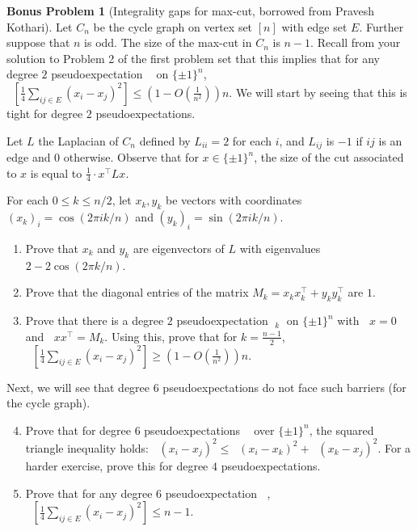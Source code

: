 \documentclass[11pt]{article}
\theoremstyle{definition}
\newtheorem{bproblem}[theorem]{Bonus Problem}
\DeclareMathOperator{\pE}{\widetilde{\mathbb{E}}} %
\begin{document}
\begin{bproblem}[Integrality gaps for max-cut, borrowed from Pravesh Kothari]
  Let $C_n$ be the cycle graph on vertex set $[n]$ with edge set $E$. Further suppose that $n$ is odd.
  The size of the max-cut in $C_n$ is $n-1$. Recall from your solution to Problem 2 of the first problem set that this implies that for any degree $2$ pseudoexpectation $\pE$ on $\{\pm 1\}^n$, $\pE\left[ \frac{1}{4} \sum_{ij \in E} (x_i - x_j)^2 \right] \le \left(1 - O\left( \frac{1}{n^2} \right)\right) n$. We will start by seeing that this is tight for degree $2$ pseudoexpectations.

  Let $L$ the Laplacian of $C_n$ defined by $L_{ii} = 2$ for each $i$, and $L_{ij}$ is $-1$ if $ij$ is an edge and $0$ otherwise. Observe that for $x \in \{\pm 1\}^n$, the size of the cut associated to $x$ is equal to $\frac{1}{4} \cdot x^\top L x$.

  For each $0 \le k \le n/2$, let $x_k,y_k$ be vectors with coordinates $(x_k)_i = \cos(2\pi ik/n)$ and $(y_k)_i = \sin(2\pi ik/n)$.


  \begin{enumerate}
    \item Prove that $x_k$ and $y_k$ are eigenvectors of $L$ with eigenvalues $2 - 2 \cos(2\pi k/n)$.
    \item Prove that the diagonal entries of the matrix $M_k = x_k x_k^\top + y_k y_k^\top$ are $1$.
    \item Prove that there is a degree $2$ pseudoexpectation $\pE_k$ on $\{\pm1\}^n$ with $\pE x = 0$ and $\pE xx^\top = M_k$. Using this, prove that for $k = \frac{n-1}{2}$, $\pE \left[ \frac{1}{4} \sum_{ij \in E} (x_i - x_j)^2 \right] \ge \left( 1 - O\left( \frac{1}{n^2} \right) \right) n$.
  \end{enumerate}

  Next, we will see that degree $6$ pseudoexpectations do not face such barriers (for the cycle graph).

  \begin{enumerate}
    \setcounter{enumi}{3}
    \item Prove that for degree $6$ pseudoexpectations $\pE$ over $\{\pm 1\}^n$, the squared triangle inequality holds: $\pE (x_i - x_j)^2 \le \pE (x_i - x_k)^2 + \pE (x_k - x_j)^2$. For a harder exercise, prove this for degree $4$ pseudoexpectations.
    \item Prove that for any degree $6$ pseudoexpectation $\pE$, $\pE \left[ \frac{1}{4} \sum_{ij \in E} (x_i - x_j)^2 \right] \le n-1$.
  \end{enumerate}

\end{bproblem}
\end{document}
